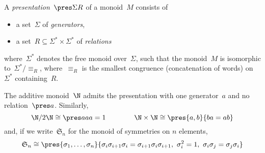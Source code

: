 \documentclass{LMCS}
\begin{document}
\begin{defi}
  A \emph{presentation}~$\pres\Sigma R$ of a monoid~$M$ consists of
  \begin{itemize}
  \item a set~$\Sigma$ of \emph{generators},
  \item a set~$R\subseteq \Sigma^*\times\Sigma^*$ of \emph{relations}
  \end{itemize}
  where~$\Sigma^*$ denotes the free monoid over~$\Sigma$, such that the
  monoid~$M$ is isomorphic to~$\Sigma^*/\equiv_R$, where~$\equiv_R$ is the
  smallest congruence (\wrt concatenation of words) on~$\Sigma^*$
  containing~$R$.
\end{defi}

\begin{exa}
  \label{ex:pres-mon}
  The additive monoid~$\N$ admits the presentation with one generator~$a$ and no
  relation~$\pres a{}$. Similarly,
  \[
  \N/2\N
  \cong
  \pres a{aa=1}
  \qquad\qquad
  \N\times\N
  \cong
  \pres{a,b}{ba=ab}
  \]
  and, if we write~$\mathfrak{S}_n$ for the monoid of symmetries on $n$
  elements,
  \[
  \mathfrak{S}_n\cong\pres{\sigma_1,\ldots,\sigma_n}{\sigma_i\sigma_{i+1}\sigma_i=\sigma_{i+1}\sigma_i\sigma_{i+1},\
    \sigma_i^2=1,\ \sigma_i\sigma_j=\sigma_j\sigma_i}
  \]
\end{exa}
\end{document}
